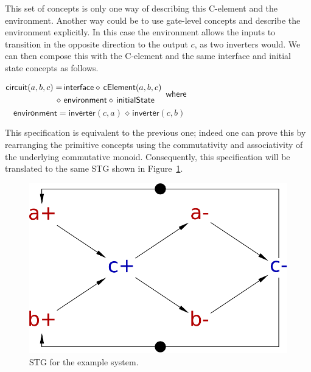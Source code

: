 \documentclass[british,compsoc]{IEEEtran}
\begin{document}
This set of concepts is only one way of describing this C-element
and the environment. Another way could be to use gate-level concepts
and describe the environment explicitly. In this case the environment
allows the inputs to transition in the opposite direction to the output
$c$, as two inverters would. We can then compose this with the C-element
and the same interface and initial state concepts as follows.

\begin{minipage}[t]{1\columnwidth}
$\begin{aligned}\mathsf{circuit}(a, b, c)=&\mathsf{\,interface}\diamond\mathsf{\,cElement}(a, b, c)\\
\diamond\, &\,\mathsf{environment}\diamond\,\mathsf{initialState}
\end{aligned}\\
$
$\mathsf{where}$\\
$\mathsf{\,\,\,\,\,\,environment}=\mathsf{inverter} (c, a) \,\diamond\,\mathsf{inverter}(c, b)$
\\
\end{minipage}
This specification is equivalent to the previous one; indeed one can
prove this by rearranging the primitive concepts using the commutativity
and associativity of the underlying commutative monoid. Consequently,
this specification will be translated to the same STG shown in
Figure~\ref{fig:cElement STG composition}.

\begin{figure}[h]
\begin{centering}
\includegraphics[scale=0.25]{Images/stg-cElement}
\par\end{centering}

\protect\caption{\label{fig:cElement STG composition}STG for the example system.}
\end{figure}
\end{document}
